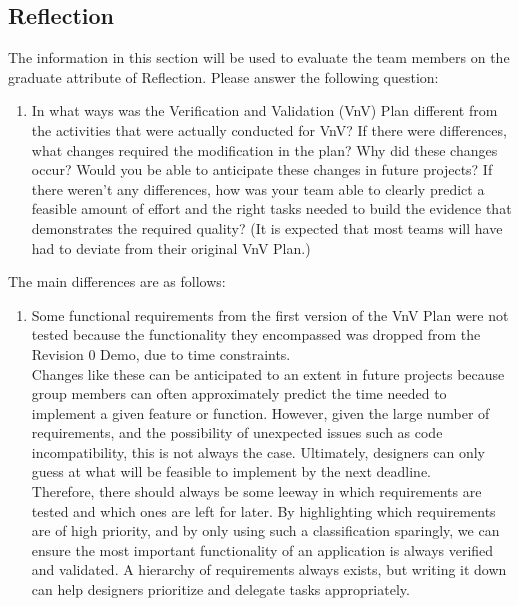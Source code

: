 \documentclass[12pt, titlepage]{article}
\begin{document}
\subsection{Reflection}

The information in this section will be used to evaluate the team members on the
graduate attribute of Reflection.  Please answer the following question:

\begin{enumerate}
  \item In what ways was the Verification and Validation (VnV) Plan different
  from the activities that were actually conducted for VnV?  If there were
  differences, what changes required the modification in the plan?  Why did
  these changes occur?  Would you be able to anticipate these changes in future
  projects?  If there weren't any differences, how was your team able to clearly
  predict a feasible amount of effort and the right tasks needed to build the
  evidence that demonstrates the required quality?  (It is expected that most
  teams will have had to deviate from their original VnV Plan.)
\end{enumerate}

The main differences are as follows:
\begin{enumerate}
    \item Some functional requirements from the first version of the VnV Plan
    were not tested because the functionality they encompassed was dropped from
    the Revision 0 Demo, due to time constraints.\\
    Changes like these can be anticipated to an extent in future projects
    because group members can often approximately predict the time needed to
    implement a given feature or function. However, given the large number of
    requirements, and the possibility of unexpected issues such as code
    incompatibility, this is not always the case. Ultimately, designers can only
    guess at what will be feasible to implement by the next deadline.
    \color{red}{In our future careers as engineers, we should couple our
    anticipation of changes with the use of Gantt charts to provide slack time,
    in case a change that requires five days ends up requiring two weeks. We are
    also better equipped to anticipate changes because now we know to do prior
    research of the technologies used, which will inform our estimates of work
    effort.}\\
    \color{black}
    Therefore, there should always be some leeway in which requirements are
    tested and which ones are left for later. By highlighting which requirements
    are of high priority, and by only using such a classification sparingly, we
    can ensure the most important functionality of an application is always
    verified and validated. A hierarchy of requirements always exists, but
    writing it down can help designers prioritize and delegate tasks
    appropriately.
\end{enumerate}
\end{document}
